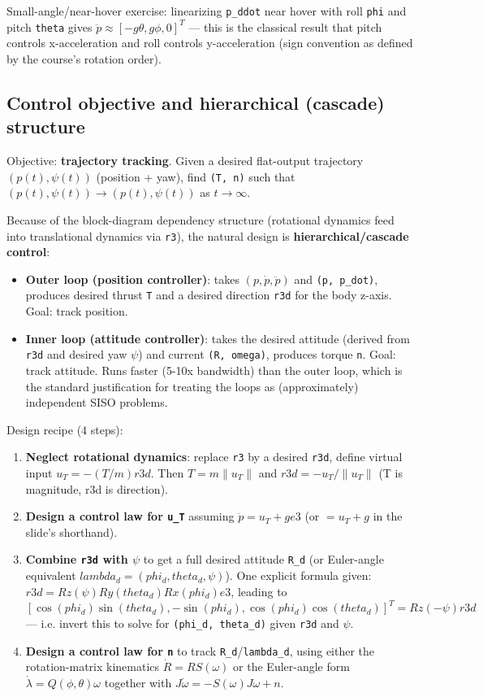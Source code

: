 \documentclass[11pt]{article}
\begin{document}
Small-angle/near-hover exercise: linearizing \texttt{p\_\allowbreak{}ddot} near hover with roll \texttt{phi} and pitch \texttt{theta} gives $\ddot{p} ≈ [-g \theta, g \phi, 0]^T$ — this is the classical result that pitch controls x-acceleration and roll controls y-acceleration (sign convention as defined by the course's rotation order).

\subsection{Control objective and hierarchical (cascade) structure}
Objective: \textbf{trajectory tracking}. Given a desired flat-output trajectory $(p (t), \psi (t))$ (position + yaw), find \texttt{(T, n)} such that $(p(t), \psi(t)) \to  (p (t), \psi (t))$ as $t \to  \infty$.

Because of the block-diagram dependency structure (rotational dynamics feed into translational dynamics via \texttt{r3}), the natural design is \textbf{hierarchical/cascade control}:
\begin{itemize}
\item \textbf{Outer loop (position controller)}: takes $(p , \dot{p} , \ddot{p} )$ and \texttt{(p, p\_\allowbreak{}dot)}, produces desired thrust \texttt{T} and a desired direction \texttt{r3d} for the body z-axis. Goal: track position.
\item \textbf{Inner loop (attitude controller)}: takes the desired attitude (derived from \texttt{r3d} and desired yaw $\psi $) and current \texttt{(R, omega)}, produces torque \texttt{n}. Goal: track attitude. Runs faster (5-10x bandwidth) than the outer loop, which is the standard justification for treating the loops as (approximately) independent SISO problems.
\end{itemize}

Design recipe (4 steps):
\begin{enumerate}
\item \textbf{Neglect rotational dynamics}: replace \texttt{r3} by a desired \texttt{r3d}, define virtual input $u_T = -(T/m) r3d$. Then $T = m \|u_T\|$ and $r3d = -u_T/\|u_T\|$ (T is magnitude, r3d is direction).
\item \textbf{Design a control law for \texttt{u\_\allowbreak{}T}} assuming $\ddot{p} = u_T + g e3$ (or $= u_T + g$ in the slide's shorthand).
\item \textbf{Combine \texttt{r3d} with $\psi $} to get a full desired attitude \texttt{R\_\allowbreak{}d} (or Euler-angle equivalent $lambda_d = (phi_d, theta_d, \psi )$). One explicit formula given: $r3d = Rz(\psi ) Ry(theta_d) Rx(phi_d) e3$, leading to $[\cos(phi_d)\sin(theta_d), -\sin(phi_d), \cos(phi_d)\cos(theta_d)]^T = Rz(-\psi ) r3d$ — i.e. invert this to solve for \texttt{(phi\_\allowbreak{}d, theta\_\allowbreak{}d)} given \texttt{r3d} and $\psi $.
\item \textbf{Design a control law for \texttt{n}} to track \texttt{R\_\allowbreak{}d}/\texttt{lambda\_\allowbreak{}d}, using either the rotation-matrix kinematics $\dot{R} = R S(\omega)$ or the Euler-angle form $\dot{\lambda} = Q(\phi,\theta) \omega$ together with $J \dot{\omega} = -S(\omega) J \omega + n$.
\end{enumerate}
\end{document}
